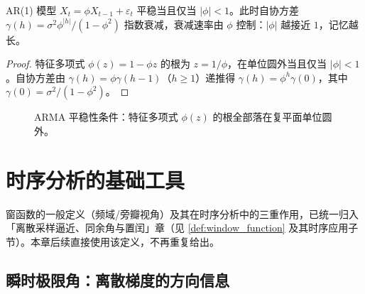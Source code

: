 \begin{property}[平稳性的几何直观]\label{prop:ts_stationarity_geometry}
AR(1) 模型 $X_t=\phi X_{t-1}+\varepsilon_t$ 平稳当且仅当 $|\phi|<1$。此时自协方差 $\gamma(h)=\sigma^2\phi^{|h|}/(1-\phi^2)$ 指数衰减，衰减速率由 $\phi$ 控制：$|\phi|$ 越接近 $1$，记忆越长。
\end{property}

\begin{proof}
特征多项式 $\phi(z)=1-\phi z$ 的根为 $z=1/\phi$，在单位圆外当且仅当 $|\phi|<1$。自协方差由 $\gamma(h)=\phi\gamma(h-1)$（$h\ge1$）递推得 $\gamma(h)=\phi^h\gamma(0)$，其中 $\gamma(0)=\sigma^2/(1-\phi^2)$。
\end{proof}

\begin{figure}[htbp]
\centering
{}
\caption{ARMA 平稳性条件：特征多项式 $\phi(z)$ 的根全部落在复平面单位圆外。}
\label{fig:stationarity_condition}
\end{figure}

\section{时序分析的基础工具}

\begin{remark}[窗函数定义的归并]\label{rem:ts_window_function_merged}
窗函数的一般定义（频域/旁瓣视角）及其在时序分析中的三重作用，已统一归入「离散采样逼近、同余角与置闰」章（见 \cref{def:window_function} 及其时序应用子节）。本章后续直接使用该定义，不再重复给出。
\end{remark}

\subsection{瞬时极限角：离散梯度的方向信息}

